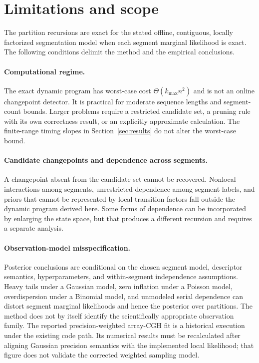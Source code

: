 \section{Limitations and scope}
\label{sec:limitations}

The partition recursions are exact for the stated offline, contiguous, locally factorized segmentation model when each segment marginal likelihood is exact. The following conditions delimit the method and the empirical conclusions.

\paragraph{Computational regime.}
The exact dynamic program has worst-case cost $\Theta(k_{\max}n^2)$ and is not an online changepoint detector. It is practical for moderate sequence lengths and segment-count bounds. Larger problems require a restricted candidate set, a pruning rule with its own correctness result, or an explicitly approximate calculation. The finite-range timing slopes in Section~\ref{sec:results} do not alter the worst-case bound.

\paragraph{Candidate changepoints and dependence across segments.}
A changepoint absent from the candidate set cannot be recovered. Nonlocal interactions among segments, unrestricted dependence among segment labels, and priors that cannot be represented by local transition factors fall outside the dynamic program derived here. Some forms of dependence can be incorporated by enlarging the state space, but that produces a different recursion and requires a separate analysis.

\paragraph{Observation-model misspecification.}
Posterior conclusions are conditional on the chosen segment model, descriptor semantics, hyperparameters, and within-segment independence assumptions. Heavy tails under a Gaussian model, zero inflation under a Poisson model, overdispersion under a Binomial model, and unmodeled serial dependence can distort segment marginal likelihoods and hence the posterior over partitions. The method does not by itself identify the scientifically appropriate observation family. The reported precision-weighted array-CGH fit is a historical execution under the existing code path. Its numerical results must be recalculated after aligning Gaussian precision semantics with the implemented local likelihood; that figure does not validate the corrected weighted sampling model.

